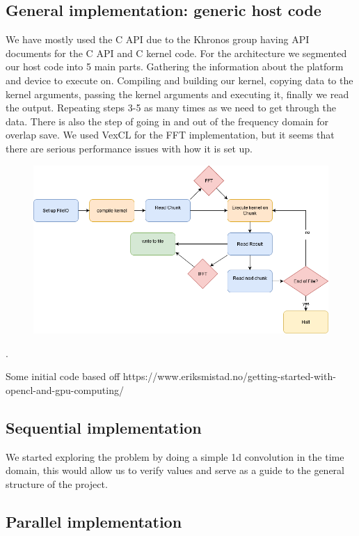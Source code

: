\documentclass{article}
\begin{document}
\subsection{General implementation: generic host code}

We have mostly used the C API due to the Khronos group having API documents for the C API and C kernel code.
For the architecture we segmented our host code into 5 main parts. Gathering the information about the platform and device to execute on. Compiling and building our kernel, copying data to the kernel arguments, passing the kernel arguments and executing it, finally we read the output. Repeating steps 3-5 as many times as we need to get through the data. There is also the step of going in and out of the frequency domain for overlap save. We used VexCL for the FFT implementation, but it seems that there are serious performance issues with how it is set up. 

\begin{figure}[!htb]
	\includegraphics[width=\linewidth]{host1.png}
	\label{fig:host1}
\end{figure}

.

Some initial code based off https://www.eriksmistad.no/getting-started-with-opencl-and-gpu-computing/

\subsection{Sequential implementation}

We started exploring the problem by doing a simple 1d convolution in the time domain, this would allow us to verify values and serve as a guide to the general structure of the project.

\subsection{Parallel implementation}
\end{document}
